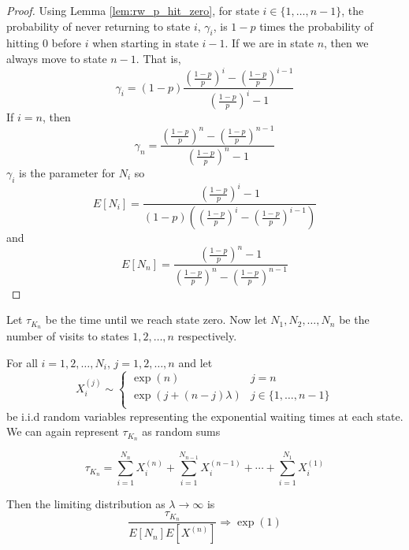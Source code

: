 \begin{proof}
Using Lemma \ref{lem:rw_p_hit_zero}, for state $i \in \{1, \ldots, n - 1\}$, the probability of never returning to state $i$, $\gamma_i$, is $1 - p$ times the probability of hitting 0 before $i$ when starting in state $i - 1$.
If we are in state $n$, then we always move to state $n - 1$. That is,
$$
\gamma_i = (1 - p) \frac{
        \left( \frac{1 - p}{p} \right)^{i} - \left( \frac{1 - p}{p} \right)^{i - 1}
    }{
        \left( \frac{1 - p}{p} \right)^{i} - 1
    }
$$
If $i = n$, then
$$
\gamma_n = \frac{
        \left( \frac{1 - p}{p} \right)^{n} - \left( \frac{1 - p}{p} \right)^{n - 1}
    }{
        \left( \frac{1 - p}{p} \right)^{n} - 1
    }
$$
$\gamma_i$ is the parameter for $N_i$ so
$$
E[N_i] = \frac{
        \left( \frac{1 - p}{p} \right)^{i} - 1
    }{
        (1 - p) \left( \left( \frac{1 - p}{p} \right)^{i} - \left( \frac{1 - p}{p} \right)^{i - 1}\right)
    }
$$
and
$$
E[N_n] = \frac{
        \left( \frac{1 - p}{p} \right)^{n} - 1
    }{
        \left( \frac{1 - p}{p} \right)^{n} - \left( \frac{1 - p}{p} \right)^{n - 1}
    }
$$
\end{proof}

\begin{theorem}
Let $\tau_{K_n}$ be the time until we reach state zero.
Now let $N_1, N_2, \ldots, N_n$ be the number of visits to states $1, 2, \ldots, n$ respectively.

For all $i = 1,2,\ldots, N_i$, $j = 1,2,\ldots, n$ and let
$$
X_i^{(j)} \sim \begin{cases}
  \exp\left( n \right) & j = n\\
  \exp\left( j + (n - j)\lambda \right) & j \in \{1,\ldots, n - 1\}\\
\end{cases}
$$
be i.i.d random variables representing the exponential waiting times at each state.
We can again represent $\tau_{K_n}$ as random sums

\begin{equation}\label{eq:wait_contact_sum}
    \tau_{K_n} = \sum_{i = 1}^{N_n} X_i^{(n)} + \sum_{i = 1}^{N_{n - 1}} X_i^{(n - 1)} + \cdots + \sum_{i = 1}^{N_1} X_i^{(1)}
\end{equation}

Then the limiting distribution as $\lambda \to \infty$ is
$$
\frac{\tau_{K_n}}{E[N_{n}]E[X^{(n)}]} \Rightarrow \exp(1)
$$
\end{theorem}

